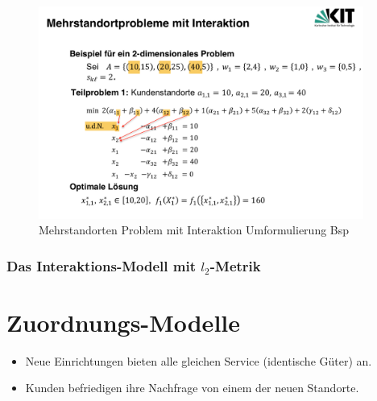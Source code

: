         \begin{exmp}
          
        \end{exmp}

        \begin{figure}[H]
          \centering
          \includegraphics[width=0.95\textwidth]{Images/Mehrstandorten_Problem_mit_Interaktion_Umformulierung_Bsp.png}
          \caption{Mehrstandorten Problem mit Interaktion Umformulierung Bsp}
          \label{fig:Mehrstandorten_Problem_mit_Interaktion_Umformulierung_Bsp}
        \end{figure}
      
      
      \subsubsection{Das Interaktions-Modell mit $l_2$-Metrik} %
      \label{ssub:das_interaktions_modell_mit_metrik}
      

    \section{Zuordnungs-Modelle} %
    \label{sub:zuordnungs_modelle}

      \begin{itemize}
        \item Neue Einrichtungen bieten alle gleichen Service (identische Güter) an.
        \item Kunden befriedigen ihre Nachfrage von einem der neuen Standorte.
      \end{itemize}

